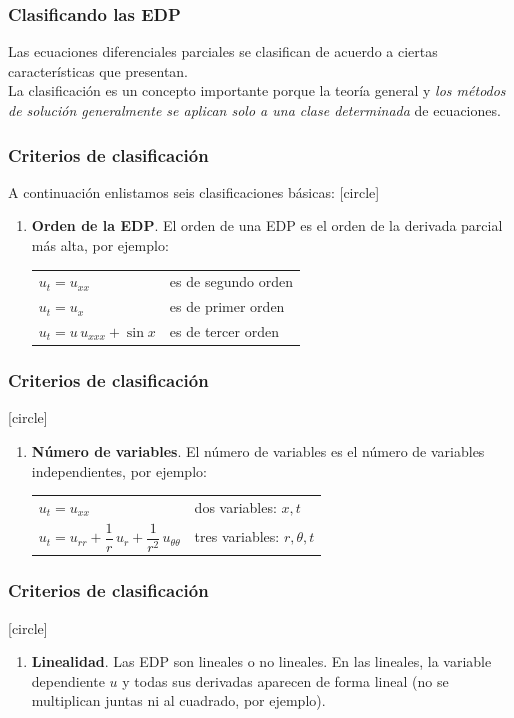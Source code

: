 \documentclass[12pt]{beamer}
\begin{document}
\begin{frame}
\frametitle{Clasificando las EDP}
Las ecuaciones diferenciales parciales se clasifican de acuerdo a ciertas características que presentan.
\\
\bigskip
\pause
La clasificación es un concepto importante porque la teoría general y \emph{los métodos de solución generalmente se aplican solo a una clase determinada} de ecuaciones.
\end{frame}
\begin{frame}
\frametitle{Criterios de clasificación}
A continuación enlistamos seis clasificaciones básicas:
\pause
{}
[circle]
\begin{enumerate}[<+->]
\item \textbf{Orden de la EDP}. El orden de una EDP es el orden de la derivada parcial más alta, por ejemplo:
\pause
\begin{table}[H]
\centering
\begin{tabular}{l l}
\Large{$u_{t} = u_{xx}$} & es de segundo orden \\ \pause
\Large{$u_{t} = u_{x}$} & es de primer orden \\ \pause
\Large{$u_{t} = u \, u_{xxx} + \sin x$} & es de tercer orden
\end{tabular}
\end{table}
\seti
\end{enumerate}
\end{frame}
\begin{frame}
\frametitle{Criterios de clasificación}
[circle]
\begin{enumerate}[<+->]    
\conti
\item \textbf{Número de variables}. El número de variables es el número de variables independientes, por ejemplo:
\begin{table}[H]
\centering
\large
\begin{tabular}{l l}
\Large{$u_{t} = u_{xx}$} & dos variables: $x, t$ \\
\Large{$u_{t} = u_{rr} + \dfrac{1}{r} \, u_{r} + \dfrac{1}{r^{2}} \, u_{\theta \theta}$} & tres variables: $r, \theta, t$
\end{tabular}
\end{table}
\seti
\end{enumerate}
\end{frame}
\begin{frame}
\frametitle{Criterios de clasificación}
[circle]
\begin{enumerate}[<+->]    
\conti
\item \textbf{Linealidad}. Las EDP son lineales o no lineales. \pause En las lineales, la variable dependiente $u$ y todas sus derivadas aparecen de forma lineal (no se multiplican juntas ni al cuadrado, por ejemplo).
\seti
\end{enumerate}
\end{frame}
\end{document}

